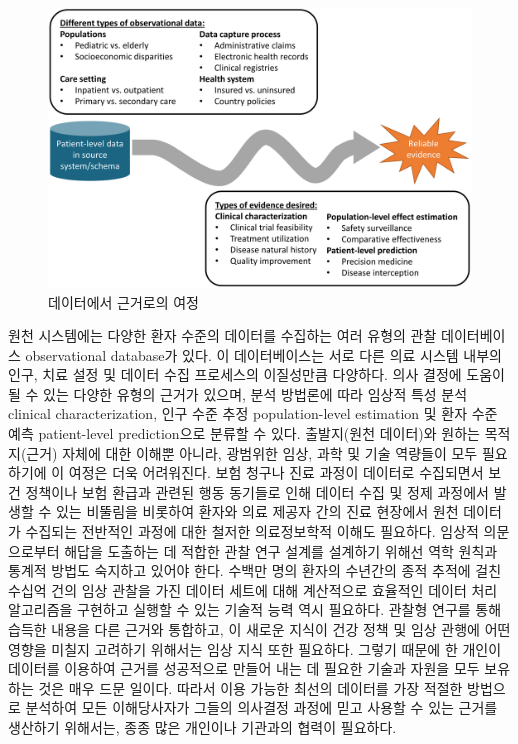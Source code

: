 \documentclass[10.5pt]{book}
\theoremstyle{definition}
\theoremstyle{definition}
\theoremstyle{definition}
\theoremstyle{remark}
\begin{document}
\begin{figure}

{\centering \includegraphics[width=1\linewidth]{images/OhdsiCommunity/datajourney} 

}

\caption{데이터에서 근거로의 여정}\label{fig:datajourney}
\end{figure}

원천 시스템에는 다양한 환자 수준의 데이터를 수집하는 여러 유형의 관찰
데이터베이스 observational database가 있다. 이 데이터베이스는 서로 다른
의료 시스템 내부의 인구, 치료 설정 및 데이터 수집 프로세스의 이질성만큼
다양하다. 의사 결정에 도움이 될 수 있는 다양한 유형의 근거가 있으며,
분석 방법론에 따라 임상적 특성 분석 clinical characterization, 인구 수준
추정 population-level estimation 및 환자 수준 예측 patient-level
prediction으로 분류할 수 있다. 출발지(원천 데이터)와 원하는 목적지(근거)
자체에 대한 이해뿐 아니라, 광범위한 임상, 과학 및 기술 역량들이 모두
필요하기에 이 여정은 더욱 어려워진다. 보험 청구나 진료 과정이 데이터로
수집되면서 보건 정책이나 보험 환급과 관련된 행동 동기들로 인해 데이터
수집 및 정제 과정에서 발생할 수 있는 비뚤림을 비롯하여 환자와 의료
제공자 간의 진료 현장에서 원천 데이터가 수집되는 전반적인 과정에 대한
철저한 의료정보학적 이해도 필요하다. 임상적 의문으로부터 해답을 도출하는
데 적합한 관찰 연구 설계를 설계하기 위해선 역학 원칙과 통계적 방법도
숙지하고 있어야 한다. 수백만 명의 환자의 수년간의 종적 추적에 걸친
수십억 건의 임상 관찰을 가진 데이터 세트에 대해 계산적으로 효율적인
데이터 처리 알고리즘을 구현하고 실행할 수 있는 기술적 능력 역시
필요하다. 관찰형 연구를 통해 습득한 내용을 다른 근거와 통합하고, 이
새로운 지식이 건강 정책 및 임상 관행에 어떤 영향을 미칠지 고려하기
위해서는 임상 지식 또한 필요하다. 그렇기 때문에 한 개인이 데이터를
이용하여 근거를 성공적으로 만들어 내는 데 필요한 기술과 자원을 모두
보유하는 것은 매우 드문 일이다. 따라서 이용 가능한 최선의 데이터를 가장
적절한 방법으로 분석하여 모든 이해당사자가 그들의 의사결정 과정에 믿고
사용할 수 있는 근거를 생산하기 위해서는, 종종 많은 개인이나 기관과의
협력이 필요하다.
\end{document}
